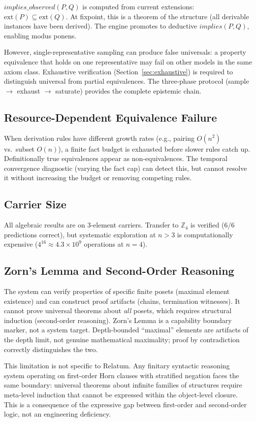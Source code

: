 $\mathit{implies\_observed}(P, Q)$ is computed from current extensions: $\mathrm{ext}(P) \subseteq \mathrm{ext}(Q)$. At fixpoint, this is a theorem of the structure (all derivable instances have been derived). The engine promotes to deductive $\mathit{implies}(P, Q)$, enabling modus ponens.

However, single-representative sampling can produce false universals: a property equivalence that holds on one representative may fail on other models in the same axiom class. Exhaustive verification (Section~\ref{sec:exhaustive}) is required to distinguish universal from partial equivalences. The three-phase protocol (sample $\to$ exhaust $\to$ saturate) provides the complete epistemic chain.

\subsection{Resource-Dependent Equivalence Failure}

When derivation rules have different growth rates (e.g., pairing $O(n^2)$ vs.\ subset $O(n)$), a finite fact budget is exhausted before slower rules catch up. Definitionally true equivalences appear as non-equivalences. The temporal convergence diagnostic (varying the fact cap) can detect this, but cannot resolve it without increasing the budget or removing competing rules.

\subsection{Carrier Size}

All algebraic results are on 3-element carriers. Transfer to $\mathbb{Z}_4$ is verified (6/6 predictions correct), but systematic exploration at $n > 3$ is computationally expensive ($4^{16} \approx 4.3 \times 10^9$ operations at $n = 4$).

\subsection{Zorn's Lemma and Second-Order Reasoning}

The system can verify properties of specific finite posets (maximal element existence) and can construct proof artifacts (chains, termination witnesses). It cannot prove universal theorems about \emph{all} posets, which requires structural induction (second-order reasoning). Zorn's Lemma is a capability boundary marker, not a system target. Depth-bounded ``maximal'' elements are artifacts of the depth limit, not genuine mathematical maximality; proof by contradiction correctly distinguishes the two.

This limitation is not specific to Relatum. Any finitary syntactic reasoning system operating on first-order Horn clauses with stratified negation faces the same boundary: universal theorems about infinite families of structures require meta-level induction that cannot be expressed within the object-level closure. This is a consequence of the expressive gap between first-order and second-order logic, not an engineering deficiency.
